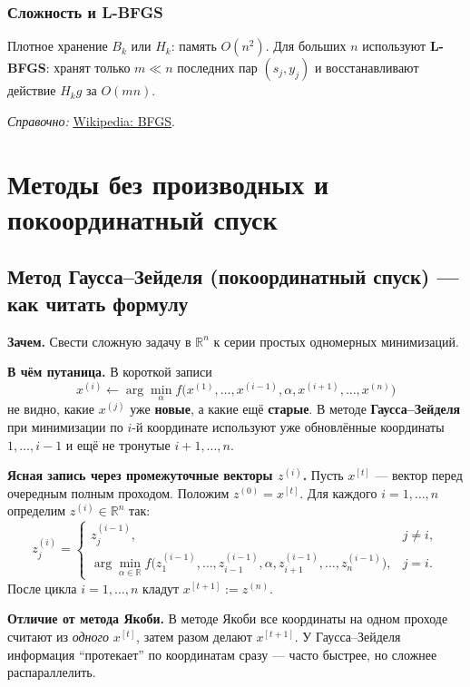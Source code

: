 \documentclass[12pt,a4paper]{article}
\newcommand{\R}{\mathbb{R}}
\begin{document}
\subsubsection{Сложность и L-BFGS}
Плотное хранение \(B_k\) или \(H_k\): память \(O(n^2)\). Для больших \(n\) используют \textbf{L-BFGS}: хранят только \(m\ll n\) последних пар \((s_j,y_j)\) и восстанавливают действие \(H_k g\) за \(O(mn)\).

\textit{Справочно:} \href{https://en.wikipedia.org/wiki/Broyden-Fletcher-Goldfarb-Shanno_algorithm}{Wikipedia: BFGS}.

\section[Без производных]{Методы без производных и покоординатный спуск}

\subsection{Метод Гаусса--Зейделя (покоординатный спуск) --- как читать формулу}
\textbf{Зачем.} Свести сложную задачу в \(\R^n\) к серии простых одномерных минимизаций.

\textbf{В чём путаница.} В короткой записи
\[
  x^{(i)} \leftarrow \arg\min_{\alpha} f\bigl(x^{(1)},\ldots,x^{(i-1)},\alpha,x^{(i+1)},\ldots,x^{(n)}\bigr)
\]
не видно, какие \(x^{(j)}\) уже \textbf{новые}, а какие ещё \textbf{старые}. В методе \textbf{Гаусса--Зейделя} при минимизации по \(i\)-й координате используют уже обновлённые координаты \(1,\ldots,i-1\) и ещё не тронутые \(i+1,\ldots,n\).

\textbf{Ясная запись через промежуточные векторы \(z^{(i)}\).}
Пусть \(x^{[t]}\) --- вектор перед очередным полным проходом. Положим \(z^{(0)}=x^{[t]}\). Для каждого \(i=1,\ldots,n\) определим \(z^{(i)}\in\R^n\) так:
\[
  z^{(i)}_j=
  \begin{cases}
    z^{(i-1)}_j, & j\neq i,\\[2mm]
    \arg\min\limits_{\alpha\in\R} f\bigl(z^{(i-1)}_1,\ldots,z^{(i-1)}_{i-1},\alpha,z^{(i-1)}_{i+1},\ldots,z^{(i-1)}_{n}\bigr), & j=i.
  \end{cases}
\]
После цикла \(i=1,\ldots,n\) кладут \(x^{[t+1]}:=z^{(n)}\).

\textbf{Отличие от метода Якоби.} В методе Якоби все координаты на одном проходе считают из \emph{одного} \(x^{[t]}\), затем разом делают \(x^{[t+1]}\). У Гаусса--Зейделя информация ``протекает'' по координатам сразу --- часто быстрее, но сложнее распараллелить.
\end{document}

